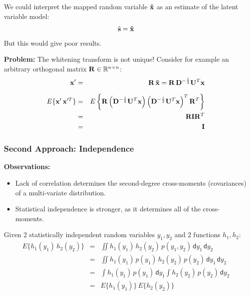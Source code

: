   We could interpret the mapped random variable $\bm{\mathrm{\tilde{x}}}$ as an estimate of the latent variable model:
  \begin{displaymath}
    \hat{\bm{\mathrm{s}}} = \bm{\mathrm{\tilde x}}
  \end{displaymath}
  But this would give poor results.                      

 \textbf {Problem:} The whitening transform is not unique!              
  Consider for example an arbitrary orthogonal matrix $\mathbf{R} \in \mathbb{R}^{n \times n}$:
%
  \small
  \begin{eqnarray*}
    \bm{\mathrm{x}}' 
    &=& \mathbf{R} \, \bm{\mathrm{\tilde x}} = \mathbf{R} \, \mathbf{D}^{-\frac{1}{2}} \mathbf{U}^T \bm{\mathrm{x}} \\[.2cm]
    E\{ \bm{\mathrm{x}}' \, \bm{\mathrm{x}}'^T \}
    &=& E\left\{ \mathbf{R} \left(\mathbf{D}^{-\frac{1}{2}} \mathbf{U}^T \bm{\mathrm{x}} \right) \left( \mathbf{D}^{-\frac{1}{2}} \mathbf{U}^T \bm{\mathrm{x}} \right)^T \mathbf{R}^T \right\} \\             
    &=& \mathbf{R} \mathbf{I} \mathbf{R}^T \\             
    &=& \mathbf{I}
  \end{eqnarray*}
         
\subsubsection{Second Approach: Independence}

 \textbf{Observations:}
  
  \begin{itemize}
    \item Lack of correlation determines the second-degree cross-moments (covariances) of a multi-variate distribution.
    \item Statistical independence is stronger, as it determines all of the cross-moments. 
  \end{itemize}

  Given 2 statistically independent random variables $y_1, y_2$ and 2 functions $h_1, h_2$:
  \footnotesize
  \begin{eqnarray*}
    E\{ h_1(y_1) \, h_2(y_2) \}
    &=& \iint h_1(y_1) \, h_2(y_2) \, p(y_1, y_2) \, \mathsf{d}y_1 \, \mathsf{d}y_2 \\             
    &=& \iint h_1(y_1) \, p(y_1) \, h_2(y_2) \, p(y_2) \, \mathsf{d}y_1 \, \mathsf{d}y_2 \\            
    &=& \int h_1(y_1) \, p(y_1) \, \mathsf{d}y_1 \int h_2(y_2) \, p(y_2) \, \mathsf{d}y_2 \\             
    &=& E\{ h_1(y_1) \} \, E\{ h_2(y_2) \}
  \end{eqnarray*}
   
